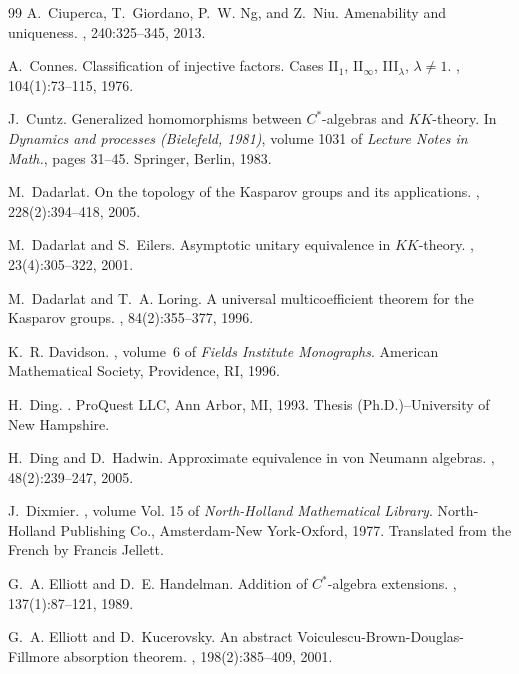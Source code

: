 \documentclass[reqno]{amsart}
\theoremstyle{definition}
\theoremstyle{remark}
\numberwithin{equation}{section}
\theoremstyle{definition}
\begin{document}
\begin{thebibliography}{99}
A.~Ciuperca, T.~Giordano, P.~W. Ng, and Z.~Niu.
\newblock Amenability and uniqueness.
, 240:325--345, 2013.

A.~Connes.
\newblock Classification of injective factors. {C}ases {II$_{1}$},
  {II$_{\infty}$}, {III$_{\lambda}$}, {$\lambda \not=1$}.
, 104(1):73--115, 1976.

J.~Cuntz.
\newblock Generalized homomorphisms between {$C^{\ast} $}-algebras and
  {$KK$}-theory.
\newblock In {\em Dynamics and processes ({B}ielefeld, 1981)}, volume 1031 of
  {\em Lecture Notes in Math.}, pages 31--45. Springer, Berlin, 1983.

M.~Dadarlat.
\newblock On the topology of the {K}asparov groups and its applications.
, 228(2):394--418, 2005.

M.~Dadarlat and S.~Eilers.
\newblock Asymptotic unitary equivalence in {$KK$}-theory.
, 23(4):305--322, 2001.

M.~Dadarlat and T.~A. Loring.
\newblock A universal multicoefficient theorem for the {K}asparov groups.
, 84(2):355--377, 1996.

K.~R. Davidson.
, volume~6 of {\em Fields Institute
  Monographs}.
\newblock American Mathematical Society, Providence, RI, 1996.

H.~Ding.
.
\newblock ProQuest LLC, Ann Arbor, MI, 1993.
\newblock Thesis (Ph.D.)--University of New Hampshire.

H.~Ding and D.~Hadwin.
\newblock Approximate equivalence in von {N}eumann algebras.
, 48(2):239--247, 2005.

J.~Dixmier.
, volume Vol. 15 of {\em North-Holland
  Mathematical Library}.
\newblock North-Holland Publishing Co., Amsterdam-New York-Oxford, 1977.
\newblock Translated from the French by Francis Jellett.

G.~A. Elliott and D.~E. Handelman.
\newblock Addition of {$C^*$}-algebra extensions.
, 137(1):87--121, 1989.

G.~A. Elliott and D.~Kucerovsky.
\newblock An abstract {V}oiculescu-{B}rown-{D}ouglas-{F}illmore absorption
  theorem.
, 198(2):385--409, 2001.


\end{thebibliography}
\end{document}
